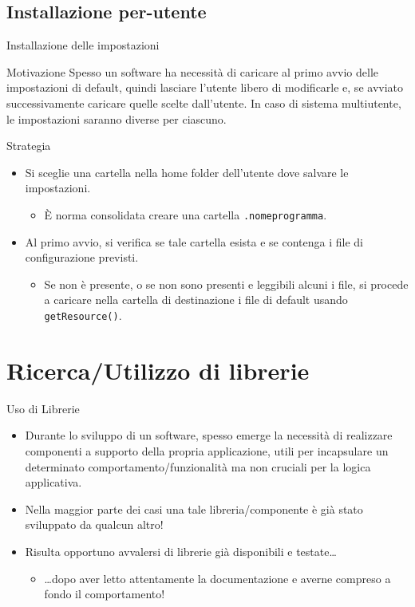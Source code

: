 \documentclass[presentation]{beamer}
\begin{document}
\subsection{Installazione per-utente}

\begin{frame}{Installazione delle impostazioni}
\begin{block}{Motivazione}
Spesso un software ha necessità di caricare al primo avvio delle impostazioni di default, quindi lasciare l'utente libero di modificarle e, se avviato successivamente caricare quelle scelte dall'utente. In caso di sistema multiutente, le impostazioni saranno diverse per ciascuno.
\end{block}

\begin{block}{Strategia}
\begin{itemize}
\item Si sceglie una cartella nella home folder dell'utente dove salvare le impostazioni. 
\begin{itemize}
\item È norma consolidata creare una cartella \texttt{.nomeprogramma}.
\end{itemize}

\item Al primo avvio, si verifica se tale cartella esista e se contenga i file di configurazione previsti.
\begin{itemize}
\item Se non è presente, o se non sono presenti e leggibili alcuni i file, si procede a caricare nella cartella di destinazione i file di default usando \texttt{getResource()}.
\end{itemize}
\end{itemize}
\end{block}
\end{frame}

\section{Ricerca/Utilizzo di librerie}
\begin{frame}{Uso di Librerie}
	\begin{itemize}\itemsep15pt
		\item Durante lo sviluppo di un software, spesso emerge la necessità di realizzare componenti a supporto della propria applicazione, utili per incapsulare un determinato comportamento/funzionalità ma non cruciali per la logica applicativa.
		\item Nella maggior parte dei casi una tale libreria/componente è già stato sviluppato da qualcun altro!
		\item Risulta opportuno avvalersi di librerie già disponibili e testate\dots
		\begin{itemize}
			\item \dots dopo aver letto attentamente la documentazione e averne compreso a fondo il comportamento!
		\end{itemize}
	\end{itemize}
\end{frame}
\end{document}
